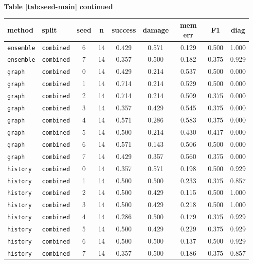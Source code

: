 \documentclass{article}
\begin{document}
\begin{center}
\textbf{Table \ref{tab:seed-main} continued}\\[0.4ex]
\begin{tabular}{llccccccc}
\toprule
method & split & seed & n & success & damage & mem err & F1 & diag \\
\midrule
\texttt{ensemble} & \texttt{combined} & 6 & 14 & 0.429 & 0.571 & 0.129 & 0.500 & 1.000 \\
\texttt{ensemble} & \texttt{combined} & 7 & 14 & 0.357 & 0.500 & 0.182 & 0.375 & 0.929 \\
\texttt{graph} & \texttt{combined} & 0 & 14 & 0.429 & 0.214 & 0.537 & 0.500 & 0.000 \\
\texttt{graph} & \texttt{combined} & 1 & 14 & 0.714 & 0.214 & 0.529 & 0.500 & 0.000 \\
\texttt{graph} & \texttt{combined} & 2 & 14 & 0.714 & 0.214 & 0.509 & 0.375 & 0.000 \\
\texttt{graph} & \texttt{combined} & 3 & 14 & 0.357 & 0.429 & 0.545 & 0.375 & 0.000 \\
\texttt{graph} & \texttt{combined} & 4 & 14 & 0.571 & 0.286 & 0.583 & 0.375 & 0.000 \\
\texttt{graph} & \texttt{combined} & 5 & 14 & 0.500 & 0.214 & 0.430 & 0.417 & 0.000 \\
\texttt{graph} & \texttt{combined} & 6 & 14 & 0.571 & 0.143 & 0.506 & 0.500 & 0.000 \\
\texttt{graph} & \texttt{combined} & 7 & 14 & 0.429 & 0.357 & 0.560 & 0.375 & 0.000 \\
\texttt{history} & \texttt{combined} & 0 & 14 & 0.357 & 0.571 & 0.198 & 0.500 & 0.929 \\
\texttt{history} & \texttt{combined} & 1 & 14 & 0.500 & 0.500 & 0.233 & 0.375 & 0.857 \\
\texttt{history} & \texttt{combined} & 2 & 14 & 0.500 & 0.429 & 0.115 & 0.500 & 1.000 \\
\texttt{history} & \texttt{combined} & 3 & 14 & 0.500 & 0.429 & 0.218 & 0.500 & 1.000 \\
\texttt{history} & \texttt{combined} & 4 & 14 & 0.286 & 0.500 & 0.179 & 0.375 & 0.929 \\
\texttt{history} & \texttt{combined} & 5 & 14 & 0.500 & 0.429 & 0.229 & 0.375 & 0.929 \\
\texttt{history} & \texttt{combined} & 6 & 14 & 0.500 & 0.500 & 0.137 & 0.500 & 0.929 \\
\texttt{history} & \texttt{combined} & 7 & 14 & 0.357 & 0.500 & 0.186 & 0.375 & 0.857 \\

\end{tabular}
\end{center}
\end{document}

